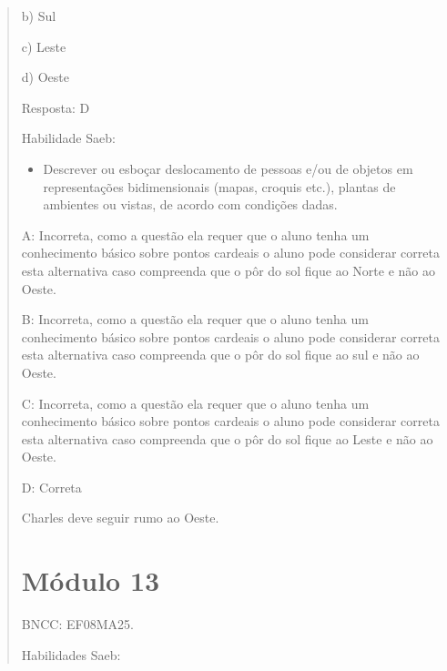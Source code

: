 \begin{quote}
\begin{escolha}
b) Sul

c) Leste

d) Oeste

Resposta: D

Habilidade Saeb:

\begin{itemize}
\tightlist
\item
  Descrever ou esboçar deslocamento de pessoas e/ou de objetos em
  representações bidimensionais (mapas, croquis etc.), plantas de
  ambientes ou vistas, de acordo com condições dadas.
\end{itemize}

A: Incorreta, como a questão ela requer que o aluno tenha um
conhecimento básico sobre pontos cardeais o aluno pode considerar
correta esta alternativa caso compreenda que o pôr do sol fique ao Norte
e não ao Oeste.

B: Incorreta, como a questão ela requer que o aluno tenha um
conhecimento básico sobre pontos cardeais o aluno pode considerar
correta esta alternativa caso compreenda que o pôr do sol fique ao sul e
não ao Oeste.

C: Incorreta, como a questão ela requer que o aluno tenha um
conhecimento básico sobre pontos cardeais o aluno pode considerar
correta esta alternativa caso compreenda que o pôr do sol fique ao Leste
e não ao Oeste.

D: Correta

Charles deve seguir rumo ao Oeste.

\chapter{Módulo 13}

BNCC: EF08MA25.

Habilidades Saeb:


\end{escolha}
\end{quote}
